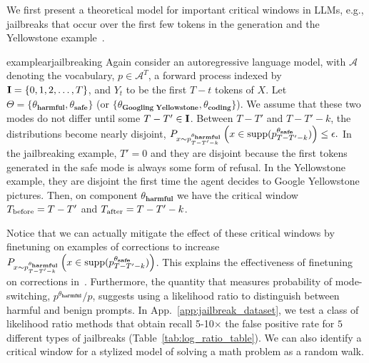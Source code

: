 \noindent We first present a theoretical model for important critical windows in LLMs, e.g., jailbreaks that occur over the first few tokens in the generation and the Yellowstone example~\citep{anthropicyellowstone,qi2024safetyalignmentjusttokens}.
\begin{restatable}{example}{arjailbreaking}\label{example:ar_jailbreak}  
Again consider an autoregressive language model, with $\mathcal{A}$ denoting the vocabulary, $p \in \mathcal{A}^T$, a forward process indexed by $\mathbf{I}=\{0,1,2,\dots,T\}$, and $Y_t$ to be the first $T-t$ tokens of $X$. Let $\Theta=\{\theta_\textbf{harmful},\theta_\textbf{safe}\}$ (or $\{\theta_{\textbf{Googling Yellowstone}},\theta_{\textbf{coding}}\}$). We assume that these two modes do not differ until some $T-T' \in \mathbf{I}$. Between $T-T'$ and $T-T'-k$, the distributions become nearly disjoint, $P_{x \sim p_{T-T'-k}^{\theta_\textbf{harmful}}}\left(x\in \mathrm{supp}(p_{T-T'-k}^{\theta_\textbf{safe}})\right) \leq \epsilon.$ In the jailbreaking example, $T'=0$ and they are disjoint because the first tokens generated in the safe mode is always some form of refusal. In the Yellowstone example, they are disjoint the first time the agent decides to Google Yellowstone pictures. Then, on component $\theta_\textbf{harmful}$ we have the critical window $T_{\mathrm{before}}= T-T'$ and $T_{\mathrm{after}}  = T-T'-k$. 
\end{restatable}
Notice that we can actually mitigate the effect of these critical windows by finetuning on examples of corrections to increase $P_{x \sim p_{T-T'-k}^{\theta_\textbf{harmful}}}\left(x\in \mathrm{supp}(p_{T-T'-k}^{\theta_\textbf{safe}})\right)$. This explains the effectiveness of finetuning on corrections in~\citep{qi2024safetyalignmentjusttokens}. Furthermore, the quantity that measures probability of mode-switching, $p^{\theta_\textbf{harmful}}/p$, suggests using a likelihood ratio to distinguish between harmful and benign prompts. In App.~\ref{app:jailbreak_dataset}, we test a class of likelihood ratio methods that obtain recall 5-10$\times$ the false positive rate for $5$ different types of jailbreaks (Table~\ref{tab:log_ratio_table}). We can also identify a critical window for a stylized model of solving a math problem as a random walk. 
